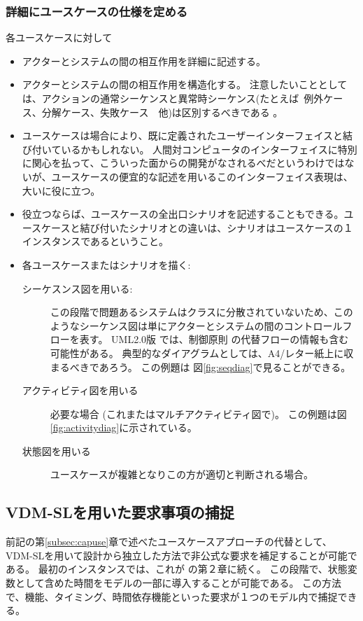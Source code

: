 \documentclass[\pformat,12pt]{jreport}
\begin{document}
\subsubsection{詳細にユースケースの仕様を定める}

各ユースケースに対して

\begin{itemize}
\item アクターとシステムの間の相互作用を詳細に記述する。
\item アクターとシステムの間の相互作用を構造化する。
注意したいこととしては、アクションの通常シーケンスと異常時シーケンス(たとえば\ 例外ケース、分解ケース、失敗ケース　他)は区別するべきである 。
\item ユースケースは場合により、既に定義されたユーザーインターフェイスと結び付いているかもしれない。
人間対コンピュータのインターフェイスに特別に関心を払って、こういった面からの開発がなされるべだというわけではないが、ユースケースの便宜的な記述を用いるこのインターフェイス表現は、大いに役に立つ。
\item 役立つならば、ユースケースの全出口シナリオを記述することもできる。ユースケースと結び付いたシナリオとの違いは、シナリオはユースケースの１インスタンスであるということ。
\item 各ユースケースまたはシナリオを描く:
\begin{description}
\item[シーケスンス図を用いる:] この段階で問題あるシステムはクラスに分散されていないため、このようなシーケンス図は単にアクターとシステムの間のコントロールフローを表す。
UML2.0版 では、制御原則 \cite{UML20}の代替フローの情報も含む可能性がある。
典型的なダイアグラムとしては、A4/レター紙上に収まるべきであろう。
この例題は 図\ref{fig:seqdiag}で見ることができる。
\item[アクティビティ図を用いる] 必要な場合 (これまたはマルチアクティビティ図で)。 この例題は図\ref{fig:activitydiag}に示されている。
\item[状態図を用いる] ユースケースが複雑となりこの方が適切と判断される場合。
\end{description}
\end{itemize}

\subsection{VDM-SLを用いた要求事項の捕捉}\label{subsec:captureVDM}
\label{subsec:VDMSL}

前記の第\ref{subsec:capuse}章で述べたユースケースアプローチの代替として、VDM-SLを用いて設計から独立した方法で非公式な要求を補足することが可能である。
最初のインスタンスでは、これが \cite{Fitzgerald&98b,Fitzgerald&05}の第２章に続く。
この段階で、状態変数として含めた時間をモデルの一部に導入することが可能である。
この方法で、機能、タイミング、時間依存機能といった要求が１つのモデル内で捕捉できる。
\end{document}
